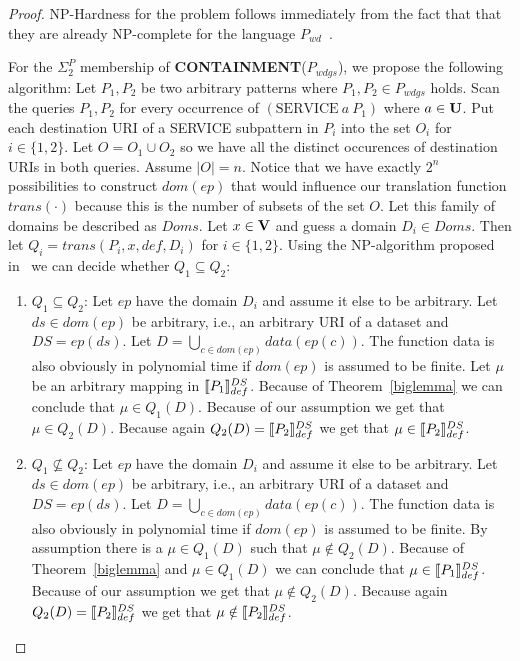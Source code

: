 \begin{proof}
	NP-Hardness for the problem follows immediately from the fact that
	that they are already NP-complete for the language
	$P_{wd}$~\cite{letelier2012static}.

	For the $\Sigma^P_2$ membership  of \textbf{CONTAINMENT}($P_{wdgs}$), we propose the following algorithm:
	Let $P_1,P_2$ be two arbitrary patterns where $P_1,P_2 \in P_{wdgs}$ holds.
	Scan the queries $P_1,P_2$ for every occurrence of $(\mbox{SERVICE} \ a \ P_1)$ where $a \in
	\mathbf{U}$. Put each destination URI of a SERVICE subpattern in $P_i$ into the set $O_i$ for $i\in
	\{1,2\}$.
	Let $O = O_1 \cup O_2$ so we have all the distinct occurences of destination
	URIs in both queries. Assume $|O| = n$. 
	Notice that we have exactly $2^n$ possibilities to construct $dom(ep)$ that would
	influence our translation function $trans(\cdot)$ because this is the
	number of subsets of the set $O$.
	Let this family of domains be described as $Doms$.
	Let $x \in \mathbf{V}$ and guess a domain $D_i\in Doms$. Then let 
	$Q_i = trans(P_i,x,def,D_i)$ for $i\in \{1,2\}$. 
	Using the NP-algorithm proposed in~\cite{letelier2012static} 
	we can decide whether $Q_1 \subseteq Q_2$:
	\begin{enumerate}
		\item $Q_1 \subseteq Q_2$:
			Let $ep$ have the domain $D_i$ and assume it else to be arbitrary.
			Let $ds \in dom(ep)$ be arbitrary, i.e., an arbitrary
			URI of a dataset and $DS = ep(ds)$. 
			Let $D =\bigcup\limits_{c\in dom(ep)} data(ep(c))$. The function data is also
			obviously in polynomial time if $dom(ep)$ is assumed to be finite. 
			Let $\mu$ be an arbitrary mapping in $\llbracket P_1 \rrbracket^{DS}_{def}$. Because
			of Theorem~\ref{biglemma} we can conclude that $\mu \in Q_1(D)$.
			Because of our assumption we get that $\mu \in Q_2(D)$. Because
			again $Q_2(D) = \llbracket P_2 \rrbracket^{DS}_{def}$ we get that $\mu \in \llbracket P_2
			\rrbracket^{DS}_{def}$.
		\item $Q_1 \not\subseteq Q_2$: 
			Let $ep$ have the domain $D_i$ and assume it else to be arbitrary.
			Let $ds \in dom(ep)$ be arbitrary, i.e., an arbitrary URI of a dataset 
			and $DS = ep(ds)$.
			Let $D =\bigcup\limits_{c\in dom(ep)} data(ep(c))$. The function data is also
			obviously in polynomial time if $dom(ep)$ is assumed to be finite.
			By assumption there is a $\mu \in
			Q_1(D)$ such that $\mu \notin Q_2(D)$. Because
			of Theorem~\ref{biglemma} and $\mu \in Q_1(D)$ we can conclude that $\mu \in \llbracket P_1
			\rrbracket^{DS}_{def}$.
			Because of our assumption we get that $\mu \notin Q_2(D)$. Because
			again $Q_2(D) = \llbracket P_2 \rrbracket^{DS}_{def}$ we get that $\mu \notin \llbracket P_2
			\rrbracket^{DS}_{def}$.
	\end{enumerate}
\end{proof}
